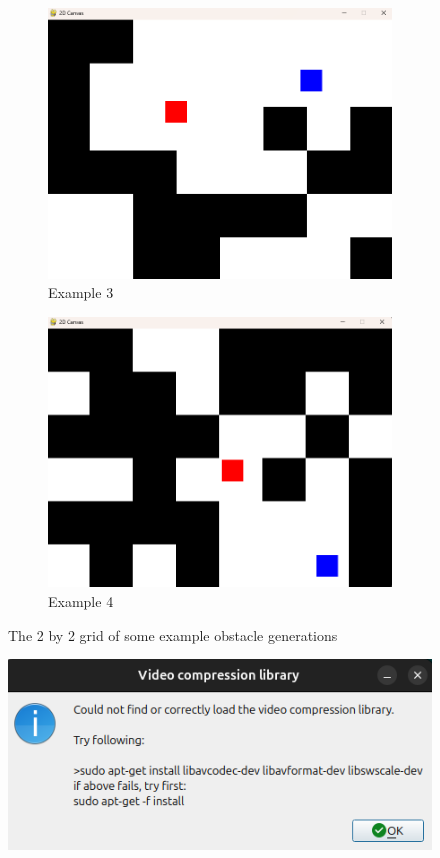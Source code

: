 \begin{figure}[htbp]
  \begin{subfigure}{0.45\textwidth}
      \centering
      \includegraphics[width=0.6\linewidth]{assets/early-work/obs-gen3.png}
      \caption{Example 3}
  \end{subfigure}%
  \hfill
  \begin{subfigure}{0.45\textwidth}
      \centering
      \includegraphics[width=0.6\linewidth]{assets/early-work/obs-gen4.png}
      \caption{Example 4}
  \end{subfigure}
  \caption{The 2 by 2 grid of some example obstacle generations}\label{fig:obs-gen}
\end{figure}




\begin{figure}[htpb] %
  \centering
  \includegraphics[scale=0.3]{assets/early-work/missing-libs.png}
  \caption{}\label{fig:missing-libs}
\end{figure}

